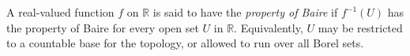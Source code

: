 A real-valued function $f$ on $\mathbb{R}$ is said to have the \emph{property of Baire} if $f^{-1}(U)$ has the property of Baire for every open set $U$ in $\mathbb{R}$. Equivalently, $U$ may be restricted to a countable base for the topology, or allowed to run over all Borel sets.
